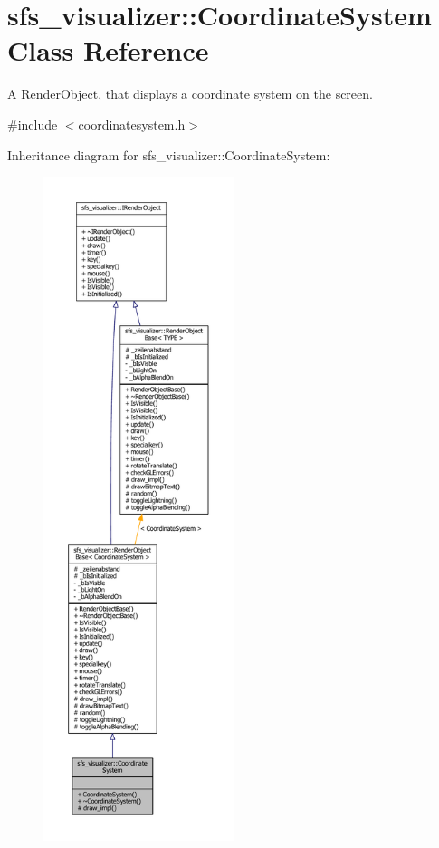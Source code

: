\section{sfs\-\_\-visualizer\-:\-:Coordinate\-System Class Reference}
\label{classsfs__visualizer_1_1CoordinateSystem}


A Render\-Object, that displays a coordinate system on the screen.  




{\ttfamily \#include $<$coordinatesystem.\-h$>$}



Inheritance diagram for sfs\-\_\-visualizer\-:\-:Coordinate\-System\-:\nopagebreak
\begin{figure}[H]
\begin{center}
\leavevmode
\includegraphics[height=550pt]{d7/d9c/classsfs__visualizer_1_1CoordinateSystem__inherit__graph}
\end{center}
\end{figure}


